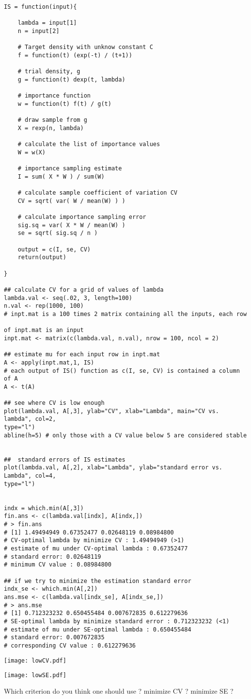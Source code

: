 \documentclass[12pt]{article}
\numberwithin{equation}{subsection}
\begin{document}
\begin{verbatim}
IS = function(input){

	lambda = input[1]
	n = input[2]
	
	# Target density with unknow constant C
	f = function(t) (exp(-t) / (t+1))
	
	# trial density, g
	g = function(t) dexp(t, lambda)
	
	# importance function
	w = function(t) f(t) / g(t)
	
	# draw sample from g
	X = rexp(n, lambda)
	
	# calculate the list of importance values
	W = w(X)
	
	# importance sampling estimate
	I = sum( X * W ) / sum(W)
	
	# calculate sample coefficient of variation CV
	CV = sqrt( var( W / mean(W) ) )
	
	# calculate importance sampling error
	sig.sq = var( X * W / mean(W) )
	se = sqrt( sig.sq / n )
	
	output = c(I, se, CV)
	return(output)

}

## calculate CV for a grid of values of lambda
lambda.val <- seq(.02, 3, length=100)
n.val <- rep(1000, 100)
# inpt.mat is a 100 times 2 matrix containing all the inputs, each row 

of inpt.mat is an input
inpt.mat <- matrix(c(lambda.val, n.val), nrow = 100, ncol = 2)

## estimate mu for each input row in inpt.mat
A <- apply(inpt.mat,1, IS) 
# each output of IS() function as c(I, se, CV) is contained a column of A
A <- t(A)

## see where CV is low enough
plot(lambda.val, A[,3], ylab="CV", xlab="Lambda", main="CV vs. lambda", col=2, 
type="l")
abline(h=5) # only those with a CV value below 5 are considered stable


##  standard errors of IS estimates
plot(lambda.val, A[,2], xlab="Lambda", ylab="standard error vs. Lambda", col=4, 
type="l")


indx = which.min(A[,3])
fin.ans <- c(lambda.val[indx], A[indx,])
# > fin.ans
# [1] 1.49494949 0.67352477 0.02648119 0.08984800
# CV-optimal lambda by minimize CV : 1.49494949 (>1)
# estimate of mu under CV-optimal lambda : 0.67352477 
# standard error: 0.02648119 
# minimum CV value : 0.08984800

## if we try to minimize the estimation standard error
indx_se <- which.min(A[,2])
ans.mse <- c(lambda.val[indx_se], A[indx_se,])
# > ans.mse
# [1] 0.712323232 0.650455484 0.007672835 0.612279636
# SE-optimal lambda by minimize standard error : 0.712323232 (<1)
# estimate of mu under SE-optimal lambda : 0.650455484
# standard error: 0.007672835
# corresponding CV value : 0.612279636
\end{verbatim}
\begin{center}
\texttt{[image: lowCV.pdf]}
\end{center}
\begin{center}
\texttt{[image: lowSE.pdf]}
\end{center}
Which criterion do you think one should use ? minimize CV ? minimize SE ?
\end{document}
